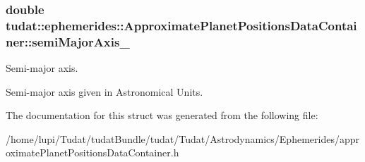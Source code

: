 \subsubsection[{\texorpdfstring{semi\+Major\+Axis\+\_\+}{semiMajorAxis_}}]{\setlength{\rightskip}{0pt plus 5cm}double tudat\+::ephemerides\+::\+Approximate\+Planet\+Positions\+Data\+Container\+::semi\+Major\+Axis\+\_\+}\hypertarget{structtudat_1_1ephemerides_1_1ApproximatePlanetPositionsDataContainer_ac08c9711d1912974f96721ec8a66f576}{}\label{structtudat_1_1ephemerides_1_1ApproximatePlanetPositionsDataContainer_ac08c9711d1912974f96721ec8a66f576}


Semi-\/major axis. 

Semi-\/major axis given in Astronomical Units. 

The documentation for this struct was generated from the following file\+:\begin{DoxyCompactItemize}
\item 
/home/lupi/\+Tudat/tudat\+Bundle/tudat/\+Tudat/\+Astrodynamics/\+Ephemerides/approximate\+Planet\+Positions\+Data\+Container.\+h\end{DoxyCompactItemize}
